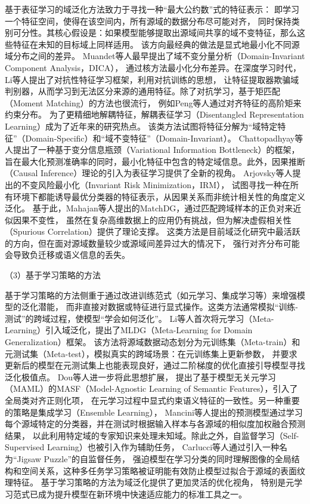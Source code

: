 基于表征学习的域泛化方法致力于寻找一种“最大公约数”式的特征表示：
即学习一个特征空间，使得在该空间内，所有源域的数据分布尽可能对齐，
同时保持类别可分性。其核心假设是：如果模型能够提取出源域间共享的域不变特征，那么这些特征在未知的目标域上同样适用。
该方向最经典的做法是显式地最小化不同源域分布之间的差异。
Muandet等人\cite{muandet2013domain}最早提出了域不变分量分析（Domain-Invariant Component Analysis，DICA），
通过核方法最小化分布差异。在深度学习时代，Li等人\cite{li2018domain}提出了对抗性特征学习框架，利用对抗训练的思想，
让特征提取器欺骗域判别器，从而学习到无法区分来源的通用特征。除了对抗学习，基于矩匹配（Moment Matching）的方法也很流行，
例如Peng等人\cite{peng2019moment}通过对齐特征的高阶矩来约束分布。
为了更精细地解耦特征，解耦表征学习（Disentangled Representation Learning）成为了近年来的研究热点。
该类方法试图将特征分解为“域特定特征”（Domain-Specific）和“域不变特征”（Domain-Invariant）。
Chattopadhyay等人\cite{chattopadhyay2020learning}提出了一种基于变分信息瓶颈（Variational Information Bottleneck）的框架，
旨在最大化预测准确率的同时，最小化特征中包含的特定域信息。此外，因果推断（Causal Inference）理论的引入为表征学习提供了全新的视角。
Arjovsky等人\cite{arjovsky2019invariant}提出的不变风险最小化（Invariant Risk Minimization，IRM），
试图寻找一种在所有环境下都能诱导最优分类器的特征表示，从因果关系而非统计相关性的角度定义泛化。
基于此，Mahajan等人\cite{mahajan2021domain}提出的MatchDG，通过匹配跨域样本的正负对来近似因果不变性，
虽然在复杂高维数据上的应用仍有挑战，但为解决虚假相关性（Spurious Correlation）提供了理论支撑。
这类方法是目前域泛化研究中最活跃的方向，但在面对源域数量较少或源域间差异过大的情况下，
强行对齐分布可能会导致负迁移或语义信息的丢失\cite{zhao2020domain}。


（3）基于学习策略的方法

基于学习策略的方法侧重于通过改进训练范式（如元学习、集成学习等）来增强模型的泛化潜能，
而非直接对数据或特征进行显式操作。这类方法通常模拟“训练-测试”的跨域过程，使模型“学会如何泛化”。
Li等人\cite{li2018learning}首次将元学习（Meta-Learning）引入域泛化，提出了MLDG（Meta-Learning for Domain Generalization）框架。
该方法将源域数据动态划分为元训练集（Meta-train）和元测试集（Meta-test），模拟真实的跨域场景：在元训练集上更新参数，
并要求更新后的模型在元测试集上也能表现良好，通过二阶梯度的优化直接引导模型寻找泛化极值点。 
Dou等人\cite{dou2019domain}进一步将此思想扩展，
提出了基于模型无关元学习（MAML）的MASF（Model-Agnostic Learning of Semantic Features），引入了全局类对齐正则化项，
在元学习过程中显式约束语义特征的一致性。另一种重要的策略是集成学习（Ensemble Learning），
Mancini等人\cite{mancini2018best}提出的预测模型通过学习每个源域特定的分类器，并在测试时根据输入样本与各源域的相似度加权融合预测结果，
以此利用特定域的专家知识来处理未知域。除此之外，自监督学习（Self-Supervised Learning）也被引入作为辅助任务，
Carlucci等人\cite{carlucci2019domain}通过引入一种名为“Jigsaw Puzzle”的自监督任务，
强迫模型在学习分类的同时理解图像的全局结构和空间关系，这种多任务学习策略被证明能有效防止模型过拟合于源域的表面纹理特征。
基于学习策略的方法\cite{balaji2018metareg,du2020learning}为域泛化提供了更加灵活的优化视角，
特别是元学习范式已成为提升模型在新环境中快速适应能力的标准工具之一\cite{wang2022generalizing}。



